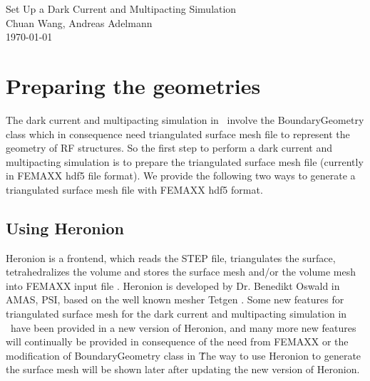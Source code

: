 \documentclass[a4paper,11pt]{article}
\begin{document}
\begin{center}
{\large Set Up a Dark Current and Multipacting Simulation} \\
Chuan Wang, Andreas Adelmann \\
\today\\
\end{center}
\section{Preparing the geometries}
The dark current and multipacting simulation in \opal\ involve the BoundaryGeometry class which in consequence need triangulated surface mesh file to represent the geometry of RF structures. So the first step to perform a dark current and multipacting simulation is to prepare the triangulated surface mesh file (currently in FEMAXX hdf5 file format). We provide the following two ways to generate a triangulated surface mesh file with FEMAXX hdf5 format.
\subsection{Using Heronion}
Heronion is a frontend, which reads the STEP file, triangulates the surface, tetrahedralizes the volume and stores the surface mesh and/or the volume mesh into FEMAXX input file \cite{heronion}. Heronion is developed by Dr. Benedikt Oswald in AMAS, PSI, based on the well known mesher Tetgen \cite{tetgen}. Some new features for triangulated surface mesh for the dark current and multipacting simulation in \opal\ have been provided in a new version of Heronion, and many more new features will continually be provided in consequence of the need from FEMAXX or the modification of BoundaryGeometry class in \opal\. The way to use Heronion to generate the surface mesh will be shown later after updating the new version of Heronion.
\end{document}
